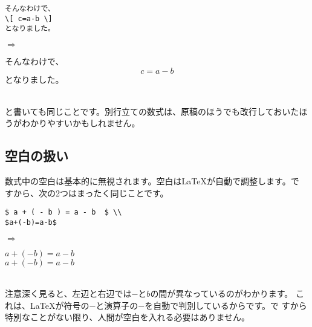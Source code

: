 \begin{minipage}[c]{.50\textwidth}
\begin{screen}
\small
\begin{verbatim}
そんなわけで、
\[ c=a-b \]
となりました。
\end{verbatim}
\end{screen}
\end{minipage}%
$\Rightarrow$
\begin{minipage}{.45\textwidth}
\begin{shadebox}
そんなわけで、
\[ c=a-b \]
となりました。
\end{shadebox}
\end{minipage}
\vspace*{1mm}\\
と書いても同じことです。別行立ての数式は、原稿のほうでも改行しておいたほ
うがわかりやすいかもしれません。

\subsection{空白の扱い}
数式中の空白は基本的に無視されます。空白は{\LaTeX}が自動で調整します。で
すから、次の2つはまったく同じことです。\\
\begin{minipage}[c]{.50\textwidth}
\begin{screen}
\small
\begin{verbatim}
$ a + ( - b ) = a - b  $ \\
$a+(-b)=a-b$
\end{verbatim}
\end{screen}
\end{minipage}%
$\Rightarrow$
\begin{minipage}{.45\textwidth}
\begin{shadebox}
$ a + ( - b ) = a - b  $ \\
$a+(-b)=a-b$
\end{shadebox}
\end{minipage}
\vspace*{1mm}\\
注意深く見ると、左辺と右辺では$-$と$b$の間が異なっているのがわかります。
これは、{\LaTeX}が符号の$-$と演算子の$-$を自動で判別しているからです。で
すから特別なことがない限り、人間が空白を入れる必要はありません。

